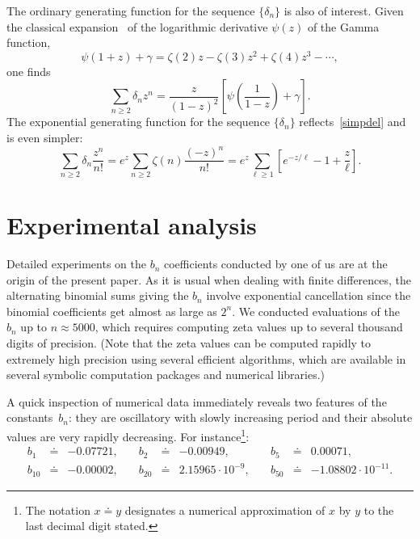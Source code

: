 \documentclass{amsart}
\begin{document}
The ordinary generating function for the sequence $\{\delta_n\}$ 
is also of interest.
Given the classical expansion~\cite{WhWa27} 
of the logarithmic derivative $\psi(z)$ of the Gamma function,
\[
\psi(1+z)+\gamma=\zeta(2)z-\zeta(3)z^2+\zeta(4)z^3-\cdots,
\]
one finds
\begin{equation}\label{delogf}
\sum_{n\ge2}\delta_n z^n =\frac{z}{(1-z)^2}\left[\psi\left(\frac{1}{1-z}\right)
+\gamma\right].
\end{equation}
The exponential generating function for the sequence  $\{\delta_n\}$ reflects~\eqref{simpdel} and is even simpler:
\begin{equation}\label{delegf}
\sum_{n\ge2}\delta_n \frac{z^n}{n!}
=e^z\sum_{n\ge2} \zeta(n) \frac{(-z)^n}{n!}=e^z \sum_{\ell\ge1}
\left[e^{-z/\ell}-1+\frac{z}{\ell}\right]
.
\end{equation}


\section{Experimental analysis}\label{exper-sec}

Detailed experiments on the $b_n$ coefficients conducted by one of us are
at the origin of the present paper. As it is usual when dealing with finite differences,
the alternating binomial sums giving the $b_n$ involve exponential
cancellation since the binomial coefficients get almost as large as $2^n$. 
We conducted evaluations of the $b_n$ up to $n\approx 5000$,
which requires computing zeta values up to several thousand digits of precision.
(Note that the zeta values can be computed rapidly to extremely high
precision using several efficient algorithms, which are available in several
symbolic computation packages and numerical libraries.)

A quick inspection of numerical data immediately reveals two features
of the constants~$b_n$: they are oscillatory with slowly increasing
period and their
absolute values are very rapidly decreasing. For instance\footnote{%
	The notation $x\doteq y$ designates a numerical approximation of
	$x$ by $y$ to the last decimal digit stated. 
}:
\[\renewcommand{\arraycolsep}{2truept}
\begin{array}{lllllllll}
b_1&\doteq&-	0.07721,\quad &
b_2&\doteq&-	0.00949,\quad &
b_5&\doteq& 	0.00071, \\
b_{10}&\doteq&-	0.00002, \quad &
b_{20}&\doteq& 	2.15965\cdot 10^{-9},\quad &
b_{50}&\doteq&-	1.08802\cdot 10^{-11}.
\end{array}\]
\end{document}

